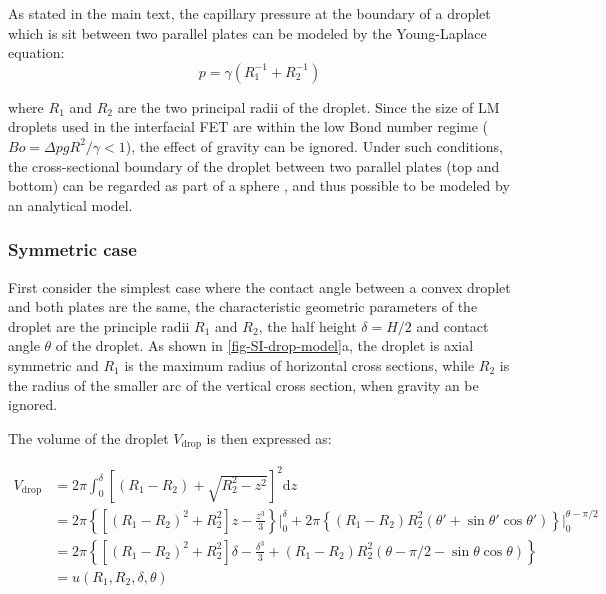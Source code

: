 As stated in the main text, the capillary pressure at the boundary of a droplet which is sit
between two parallel plates can be modeled by the Young-Laplace
equation:
\begin{equation}
\label{eq:small-3}
p = \gamma (R_{1}^{-1} + R_{2}^{-1})
\end{equation}

where \(R_{1}\) and \(R_{2}\) are the two principal radii of the
droplet. Since the size of LM droplets used in the interfacial FET are
within the low Bond number regime (\(Bo = \Delta p g R^{2} / \gamma <
1\)), the effect of gravity can be ignored. Under such conditions,
the cross-sectional boundary of the droplet between two parallel
plates (top and bottom) can be regarded as part of a sphere
\cite{berthier_2012_microdroplet}, and thus possible to be modeled by an
analytical model.

\subsubsection{Symmetric case}
\label{sec:small-org5934fd4}

First consider the simplest case where the contact angle
between a convex droplet and both plates are the same, the
characteristic geometric parameters of the droplet are the principle
radii \(R_{1}\) and \(R_{2}\), the half height \(\delta=H/2\) and contact
angle \(\theta\) of the droplet. As
shown in  \autoref{fig-SI-drop-model}a, the droplet is axial
symmetric and \(R_{1}\) is the maximum radius of horizontal cross
sections, while \(R_{2}\) is the radius of the smaller arc of the
vertical cross section, when gravity an be ignored.

The volume of the droplet \(V_{\mathrm{drop}}\) is then expressed as:

\begin{equation}
\label{eq:small-sym-1}
\begin{aligned}
V_{\mathrm{drop}} &= 2 \pi \int_{0}^{\delta} \left[ (R_{1} - R_{2}) + \sqrt{R_{2}^{2} - z^{2}}\right]^{2} \mathrm{d}z \\
  &= 2\pi \left\{ \left[(R_{1} - R_{2})^{2} + R_{2}^{2} \right] z 
- \frac{z^{3}}{3} \right\} \Bigg|_{0}^{\delta}
 + 2 \pi \left\{(R_{1} - R_{2}) R_{2}^{2} (\theta' + \sin \theta' \cos \theta')
\right\} \Bigg |_{0}^{\theta - \pi/2} \\
&= 2 \pi \left \{ [(R_{1} - R_{2})^{2} + R_{2}^{2}]\delta - \frac{\delta^{3}}{3} + (R_{1} - R_{2}) R_{2}^{2} (\theta - \pi/2 -\sin \theta \cos \theta)\right\} \\
&= u(R_{1}, R_{2}, \delta, \theta)
\end{aligned}
\end{equation}


